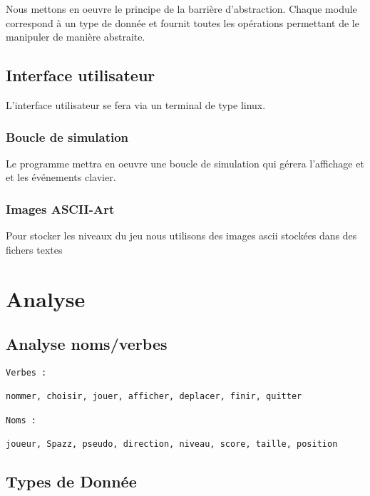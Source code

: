 \documentclass[a4paper,11pt]{scrartcl}
\begin{document}
Nous mettons en oeuvre le principe de la barrière d'abstraction. Chaque module correspond à un type de donnée et fournit toutes les opérations permettant de le manipuler de manière abstraite.

\subsection{Interface utilisateur}

L'interface utilisateur se fera via un terminal de type linux.\\

\subsubsection{Boucle de simulation}

Le programme mettra en oeuvre une boucle de simulation qui gérera l'affichage et et les événements clavier.

\subsubsection{Images ASCII-Art}

Pour stocker les niveaux du jeu nous utilisons des images ascii stockées dans des fichers textes

\newpage

\section{Analyse}

\subsection{Analyse noms/verbes}

\begin{lstlisting}
Verbes :

nommer, choisir, jouer, afficher, deplacer, finir, quitter

Noms :

joueur, Spazz, pseudo, direction, niveau, score, taille, position
\end{lstlisting}

\subsection{Types de Donnée}


\end{document}
